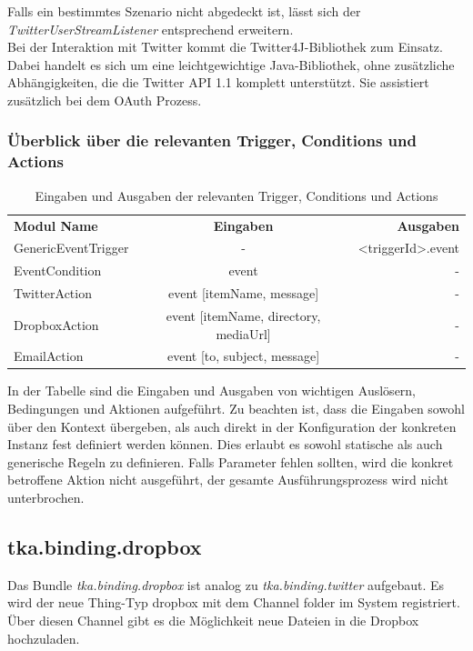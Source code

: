 Falls ein bestimmtes Szenario nicht abgedeckt ist, lässt sich der \textit{TwitterUserStreamListener} entsprechend erweitern.\\



Bei der Interaktion mit Twitter kommt die Twitter4J-Bibliothek\cite{twitter4j} zum Einsatz. Dabei handelt es sich um eine leichtgewichtige Java-Bibliothek, ohne zusätzliche Abhängigkeiten, die die Twitter API 1.1 komplett unterstützt. Sie assistiert zusätzlich bei dem OAuth Prozess.\\



\subsubsection{Überblick über die relevanten Trigger, Conditions und Actions}
\begin{table}[h]
\centering
\begin{tabular}{l|c|r}
	\textbf{Modul Name}  & \textbf{Eingaben} & \textbf{Ausgaben} \\
	GenericEventTrigger  & -        			&  <triggerId>.event   \\ 
    EventCondition		&	event   			&	-\\
    TwitterAction		&	event [itemName, message]	& 	-	\\
    DropboxAction		&	event [itemName, directory, mediaUrl]	& - \\
    EmailAction			&	event [to, subject, message]	& -\\
\end{tabular}
\caption{Eingaben und Ausgaben der relevanten Trigger, Conditions und Actions}
\label{table:io}
\end{table}

In der Tabelle sind die Eingaben und Ausgaben von wichtigen Auslösern, Bedingungen und Aktionen aufgeführt. Zu beachten ist, dass die Eingaben sowohl über den Kontext übergeben, als auch direkt in der Konfiguration der konkreten Instanz fest definiert werden können. Dies erlaubt es sowohl statische als auch generische Regeln zu definieren. Falls Parameter fehlen sollten, wird die konkret betroffene Aktion nicht ausgeführt, der gesamte Ausführungsprozess wird nicht unterbrochen.

\subsection{tka.binding.dropbox}
Das Bundle \textit{tka.binding.dropbox} ist analog zu \textit{tka.binding.twitter} aufgebaut. Es wird der neue Thing-Typ \glqq dropbox\grqq{} mit dem Channel \glqq folder\grqq{} im System registriert. Über diesen Channel gibt es die Möglichkeit neue Dateien in die Dropbox hochzuladen. \\

